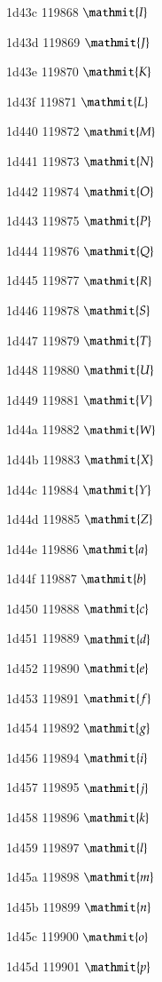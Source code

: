 \documentclass[11pt]{article}
\begin{document}
1d43c 119868 \ensuremath{\mathmit{I}}

1d43d 119869 \ensuremath{\mathmit{J}}

1d43e 119870 \ensuremath{\mathmit{K}}

1d43f 119871 \ensuremath{\mathmit{L}}

1d440 119872 \ensuremath{\mathmit{M}}

1d441 119873 \ensuremath{\mathmit{N}}

1d442 119874 \ensuremath{\mathmit{O}}

1d443 119875 \ensuremath{\mathmit{P}}

1d444 119876 \ensuremath{\mathmit{Q}}

1d445 119877 \ensuremath{\mathmit{R}}

1d446 119878 \ensuremath{\mathmit{S}}

1d447 119879 \ensuremath{\mathmit{T}}

1d448 119880 \ensuremath{\mathmit{U}}

1d449 119881 \ensuremath{\mathmit{V}}

1d44a 119882 \ensuremath{\mathmit{W}}

1d44b 119883 \ensuremath{\mathmit{X}}

1d44c 119884 \ensuremath{\mathmit{Y}}

1d44d 119885 \ensuremath{\mathmit{Z}}

1d44e 119886 \ensuremath{\mathmit{a}}

1d44f 119887 \ensuremath{\mathmit{b}}

1d450 119888 \ensuremath{\mathmit{c}}

1d451 119889 \ensuremath{\mathmit{d}}

1d452 119890 \ensuremath{\mathmit{e}}

1d453 119891 \ensuremath{\mathmit{f}}

1d454 119892 \ensuremath{\mathmit{g}}

1d456 119894 \ensuremath{\mathmit{i}}

1d457 119895 \ensuremath{\mathmit{j}}

1d458 119896 \ensuremath{\mathmit{k}}

1d459 119897 \ensuremath{\mathmit{l}}

1d45a 119898 \ensuremath{\mathmit{m}}

1d45b 119899 \ensuremath{\mathmit{n}}

1d45c 119900 \ensuremath{\mathmit{o}}

1d45d 119901 \ensuremath{\mathmit{p}}
\end{document}
